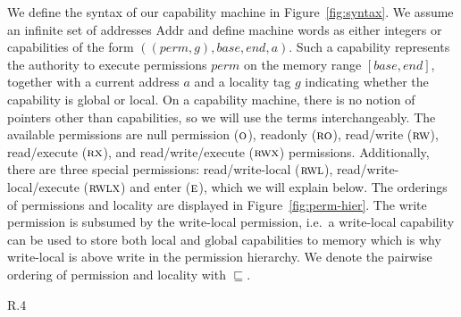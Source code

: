 \documentclass[format=acmsmall, review=true, screen=true]{acmart}
\renewcommand{\figurename}{Figure}
\newcommand{\var}[1]{\mathit{#1}}
\newcommand{\gl}{\var{g}}
\newcommand{\addr}{\var{a}}
\newcommand{\perm}{\var{perm}}
\newcommand{\plaindom}[1]{\mathrm{#1}}
\newcommand{\Addrs}{\plaindom{Addr}}
\newcommand{\plainperm}[1]{\textsc{#1}}
\newcommand{\noperm}{\plainperm{o}}
\newcommand{\readonly}{\plainperm{ro}}
\newcommand{\readwrite}{\plainperm{rw}}
\newcommand{\exec}{\plainperm{rx}}
\newcommand{\entry}{\plainperm{e}}
\newcommand{\rwx}{\plainperm{rwx}}
\newcommand{\readwritel}{\plainperm{rwl}}
\newcommand{\rwlx}{\plainperm{rwlx}}
\newcommand{\plainlocality}[1]{\mathrm{#1}}
\newcommand{\local}{\plainlocality{local}}
\newcommand{\glob}{\plainlocality{global}}
\newcommand{\itoplas}[1]{#1}
\begin{document}
We define the syntax of our capability machine in \figurename~\ref{fig:syntax}.
We assume an infinite set of addresses $\Addrs$ and define machine words as either integers or capabilities of the form $((\perm,\gl),\var{base},\var{end},\addr)$.
Such a capability represents the authority to execute permissions $\perm$ on the memory range $[\var{base},\var{end}]$, together with a current address $\addr$ and a locality tag $\gl$ indicating whether the capability is global or local.
On a capability machine, there is no notion of pointers other than capabilities, so we will use the terms interchangeably.
The available permissions are null permission ($\noperm$), readonly ($\readonly$), read/write ($\readwrite$), read/execute ($\exec$), and read/write/execute ($\rwx$) permissions.
Additionally, there are three special permissions: read/write-local ($\readwritel$), read/write-local/execute ($\rwlx$) and enter ($\entry$), which we will explain below.
\itoplas{The orderings of permissions and locality are displayed in \figurename~\ref{fig:perm-hier}.
  The write permission is subsumed by the write-local permission, i.e.\ a write-local capability can be used to store both $\local$ and $\glob$ capabilities to memory which is why write-local is above write in the permission hierarchy.
  We denote the pairwise ordering of permission and locality with $\sqsubseteq$.}

\begin{wrapfigure}{R}{.4\textwidth}
  \centering
  \caption{Permission and locality hierarchy.}
  \label{fig:perm-hier}
\end{wrapfigure}
\end{document}
